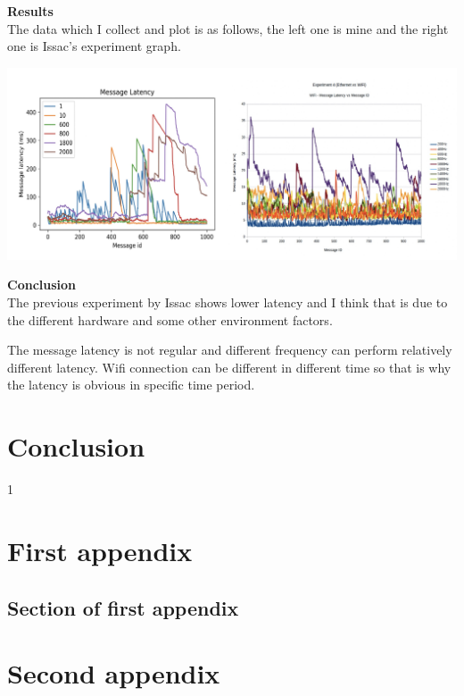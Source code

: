 \documentclass{mproj}
\begin{document}
\textbf{Results} \\
The data which I collect and plot is as follows, the left one is mine and the right one is Issac's experiment graph.

\includegraphics[width = 1\textwidth]{compare_issac.jpg}

\textbf{Conclusion} \\
The previous experiment by Issac shows lower latency and I think that is due to the different hardware and some other environment factors.

The message latency is not regular and different frequency can perform relatively different latency. Wifi connection can be different in different time so that is why the latency is obvious in specific time period.




\chapter{Conclusion}\label{conclusion}
1






\appendix %
\chapter{First appendix}

\section{Section of first appendix}

\chapter{Second appendix}
\end{document}
